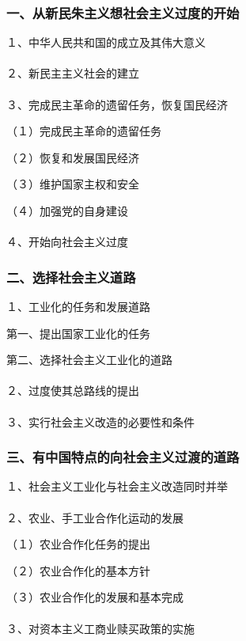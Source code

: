 \documentclass{ctexart}
\begin{document}
\subsubsection{一、从新民朱主义想社会主义过度的开始}

１、中华人民共和国的成立及其伟大意义
\\\\

２、新民主主义社会的建立
\\\\

３、完成民主革命的遗留任务，恢复国民经济

（１）完成民主革命的遗留任务

（２）恢复和发展国民经济

（３）维护国家主权和安全

（４）加强党的自身建设
\\\\

４、开始向社会主义过度

\subsubsection{二、选择社会主义道路}
１、工业化的任务和发展道路

第一、提出国家工业化的任务

第二、选择社会主义工业化的道路
\\\\

２、过度使其总路线的提出
\\\\

３、实行社会主义改造的必要性和条件

\subsubsection{三、有中国特点的向社会主义过渡的道路}

１、社会主义工业化与社会主义改造同时并举
\\\\

２、农业、手工业合作化运动的发展

（１）农业合作化任务的提出

（２）农业合作化的基本方针

（３）农业合作化的发展和基本完成
\\\\

３、对资本主义工商业赎买政策的实施
\\\\
\end{document}

